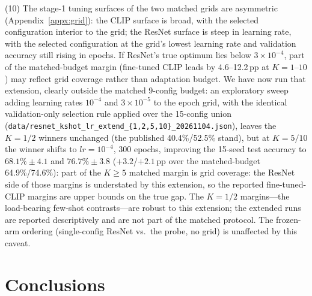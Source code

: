 \documentclass[10pt,a4paper]{article}
\begin{document}
(10) The stage-1 tuning surfaces of the two matched grids are asymmetric (Appendix~\ref{appx:grid}): the CLIP surface is broad, with the selected configuration interior to the grid; the ResNet surface is steep in learning rate, with the selected configuration at the grid's lowest learning rate and validation accuracy still rising in epochs. If ResNet's true optimum lies below $3\times10^{-4}$, part of the matched-budget margin (fine-tuned CLIP leads by 4.6--12.2\,pp at $K{=}1$--$10$) may reflect grid coverage rather than adaptation budget. We have now run that extension, clearly outside the matched 9-config budget: an exploratory sweep adding learning rates $10^{-4}$ and $3\times10^{-5}$ to the epoch grid, with the identical validation-only selection rule applied over the 15-config union (\texttt{data/resnet\_kshot\_lr\_extend\_\{1,2,5,10\}\_20261104.json}), leaves the $K{=}1/2$ winners unchanged (the published 40.4\%/52.5\% stand), but at $K{=}5/10$ the winner shifts to $lr{=}10^{-4}$, 300 epochs, improving the 15-seed test accuracy to $68.1\%\pm4.1$ and $76.7\%\pm3.8$ ($+3.2$/$+2.1$\,pp over the matched-budget 64.9\%/74.6\%): part of the $K{\geq}5$ matched margin is grid coverage: the ResNet side of those margins is understated by this extension, so the reported fine-tuned-CLIP margins are upper bounds on the true gap. The $K{=}1/2$ margins---the load-bearing few-shot contrasts---are robust to this extension; the extended runs are reported descriptively and are not part of the matched protocol. The frozen-arm ordering (single-config ResNet vs.\ the probe, no grid) is unaffected by this caveat.


\section{Conclusions}
\label{sec:conclusion}
\end{document}
